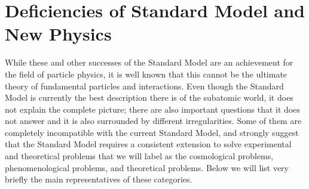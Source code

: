 \section{Deficiencies of Standard Model and New Physics}
While these and other successes of the Standard Model are an achievement for the field of particle physics, it is well known that this cannot be the ultimate theory of fundamental particles and interactions. Even though the Standard Model is currently the best description there is of the subatomic world, it does not explain the complete picture; there are also important questions that it does not answer and it is also surrounded by different irregularities. Some of them are completely incompatible with the current Standard Model, and strongly suggest that the Standard Model requires a consistent extension to solve experimental and theoretical problems that we will label as the cosmological problems, phenomenological problems, and theoretical problems. Below we will list very briefly the main representatives of these categories.

